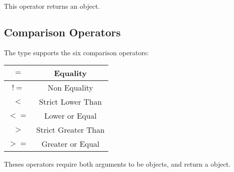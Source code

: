 This operator returns an  object.





\subsection{Comparison Operators}

The  type supports the six comparison operators:\newline

\begin{tabular}{|c|c|}
\hline
$=$ & Equality \\
\hline
$!=$ & Non Equality \\
\hline
$<$  & Strict Lower Than \\
\hline
$<=$  & Lower or Equal \\
\hline
$>$  & Strict Greater Than \\
\hline
$>=$  & Greater or Equal \\
\hline
\end{tabular}\newline

Theses operators require both arguments to be  objects, and return a  object.


